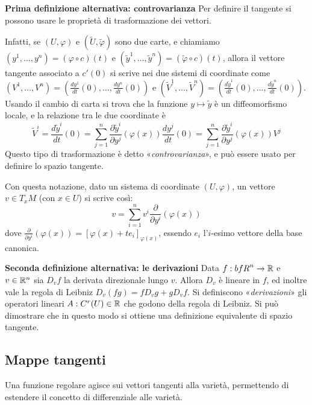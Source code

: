  \begin{paragraph}
  {\bf  Prima definizione alternativa: controvarianza} Per definire il tangente si possono
  usare le proprietà di trasformazione dei vettori.
  
  Infatti, se $(U,\varphi)$ e $(\tilde{U},\tilde{\varphi})$ sono due carte, e chiamiamo
  $(y^1,\dots,y^n)=(\varphi\circ c)(t)$ e $(\tilde{y}^1,\dots,\tilde{y}^n)=(\tilde{\varphi}\circ c)(t)$,
  allora il vettore tangente associato a $c'(0)$ si scrive nei due sistemi di coordinate
  come $(V^1,\dots,V^n)=(\frac{dy^1}{dt}(0),\dots,\frac{dy^n}{dt}(0))$ e
  $(\tilde{V}^1,\dots,\tilde{V}^n)=(\frac{d\tilde{y}^1}{dt}(0),\dots,\frac{d\tilde{y}^n}{dt}(0))$.
  Usando il cambio di carta si trova che la funzione $y\mapsto\tilde{y}$ è un diffeomorfismo
  locale, e la relazione tra le due coordinate è
  $$\tilde{V}^i=\frac{d\tilde{y}^i}{dt}(0)=\sum_{j=1}^n\frac{\partial\tilde{y}^i}{\partial y^j}(\varphi(x))
  \frac{dy^j}{dt}(0)=\sum_{j=1}^n\frac{\partial\tilde{y}^i}{\partial y^j}(\varphi(x))V^j$$
  Questo tipo di trasformazione è detto «\emph{controvarianza}», e può essere usato per
  definire lo spazio tangente.
  
  Con questa notazione, dato un sistema di coordinate $(U,\varphi)$, un vettore $v\in T_x M$
  (con $x\in U$) si scrive così:
  $$v=\sum_{i=1}^nv^i\frac{\partial}{\partial y^i}(\varphi(x))$$
  dove $\frac{\partial}{\partial y^i}(\varphi(x))=[\varphi(x)+te_i]_{\varphi(x)}$, essendo $e_i$ l'$i$-esimo
  vettore della base canonica.
 \end{paragraph}

 \begin{paragraph}
  {\bf  Seconda definizione alternativa: le derivazioni} Data $f:{bf R }^n\to\mathbb R$
  e $v\in\mathbb R^n$ sia $D_vf$ la derivata direzionale lungo $v$. Allora $D_v$ è lineare
  in $f$, ed inoltre vale la regola di Leibniz $D_v(fg)=fD_vg+gD_vf$. Si definiscono
  «\emph{derivazioni}» gli operatori lineari $A:C^r(U)\in\mathbb R$ che godono della
  regola di Leibniz. Si può dimostrare che in questo modo si ottiene una definizione
  equivalente di spazio tangente.
  \end{paragraph}
 
 \subsection{ Mappe tangenti}
 
 Una funzione regolare agisce sui vettori tangenti alla varietà, permettendo di estendere
 il concetto di differenziale alle varietà.
 
